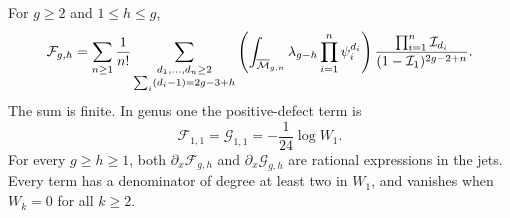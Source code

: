 \begin{lmm}\label{lmm:s07:finite-jets}
For $g\geq2$ and $1\leq h\leq g$,
\begin{equation}\label{eq:s07:finite-jets}
 \mathcal F_{g,h}
 =\sum_{n\geq1}\frac1{n!}
   \sum_{\substack{d_1,\ldots,d_n\geq2\\
                   \sum_i(d_i-1)=2g-3+h}}
   \left(\int_{\overline{\mathcal{M}}_{g,n}}\lambda_{g-h}
                                  \prod_{i=1}^n\psi_i^{d_i}\right)
   \frac{\prod_{i=1}^n\mathcal I_{d_i}}
        {(1-\mathcal I_1)^{2g-2+n}}.
\end{equation}
The sum is finite. In genus one the positive-defect term is
\begin{equation}\label{eq:s07:genus-one-seed}
 \mathcal F_{1,1}=\mathcal G_{1,1}
                         =-\frac1{24}\log W_1.
\end{equation}
For every $g\geq h\geq1$, both
$\partial_x\mathcal F_{g,h}$ and
$\partial_x\mathcal G_{g,h}$ are rational expressions in the jets.
Every term has a denominator of degree at least two in $W_1$, and
vanishes when $W_k=0$ for all $k\geq2$.
\end{lmm}
